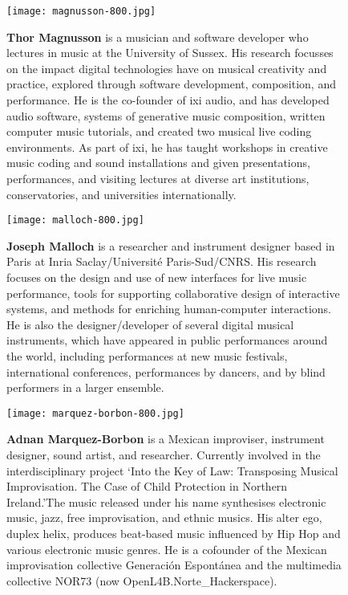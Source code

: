 \begin{authbio}
\begin{figure}[H]
  \sidecaption[t]
  \texttt{[image: magnusson-800.jpg]}
  \caption{\textbf{Thor Magnusson} is a musician and software developer who lectures in music at the University of Sussex. His research focusses on the impact digital technologies have on musical creativity and practice, explored through software development, composition, and performance. He is the co-founder of ixi audio, and has developed audio software, systems of generative music composition, written computer music tutorials, and created two musical live coding environments. As part of ixi, he has taught workshops in creative music coding and sound installations and given presentations, performances, and visiting lectures at diverse art institutions, conservatories, and universities internationally.}
\end{figure}

\begin{figure}[H]
  \sidecaption[t]
  \texttt{[image: malloch-800.jpg]}
  \caption{\textbf{Joseph Malloch} is a researcher and instrument designer based in Paris at Inria Saclay/Universit\'e Paris-Sud/CNRS. His research focuses on the design and use of new interfaces for live music performance, tools for supporting collaborative design of interactive systems, and methods for enriching human-computer interactions. He is also the designer/developer of several digital musical instruments, which have appeared in public performances around the world, including performances at new music festivals, international conferences, performances by dancers, and by blind performers in a larger ensemble.}
\end{figure}

\begin{figure}[H]
  \sidecaption[t]
  \texttt{[image: marquez-borbon-800.jpg]}
  \caption{\textbf{Adnan Marquez-Borbon} is a Mexican improviser, instrument designer, sound artist, and researcher. Currently involved in the interdisciplinary project \lq Into the Key of Law: Transposing Musical Improvisation. The Case of Child Protection in Northern Ireland.\rq The music released under his name synthesises electronic music, jazz, free improvisation, and ethnic musics. His alter ego, duplex helix, produces beat-based music influenced by Hip Hop and various electronic music genres. He is a cofounder of the Mexican improvisation collective Generaci\'on Espont\'{a}nea and the multimedia collective NOR73 (now OpenL4B.Norte\_Hackerspace).}
\end{figure}


\end{authbio}
